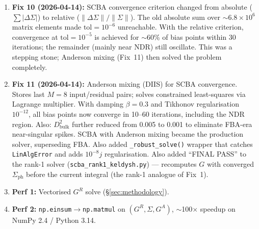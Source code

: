 \documentclass[11pt,a4paper,onecolumn]{article}
\newcommand{\code}[1]{\texttt{\small #1}}
\begin{document}
\begin{enumerate}[leftmargin=1.3em,itemsep=0pt]
$0.005 \times 35 \approx 0.1 \times 3$ (matching the molecular vibron's
effective coupling weight). Conservation improved to $<1$\%.
\item \textbf{Fix 10 (2026-04-14):} SCBA convergence criterion changed from
absolute ($\sum|\Delta\Sigma|$) to relative ($\|\Delta\Sigma\|/\|\Sigma\|$).
The old absolute sum over $\sim 6.8 \times 10^6$ matrix elements made
$\mathrm{tol} = 10^{-6}$ unreachable. With the relative criterion,
convergence at $\mathrm{tol} = 10^{-5}$ is achieved for $\sim$60\% of bias
points within 30 iterations; the remainder (mainly near NDR) still oscillate.
This was a stepping stone; Anderson mixing (Fix~11) then solved the problem
completely.
\item \textbf{Fix 11 (2026-04-14):} Anderson mixing (DIIS) for SCBA convergence.
Stores last $M = 8$ input/residual pairs; solves constrained least-squares via
Lagrange multiplier. With damping $\beta = 0.3$ and Tikhonov regularisation
$10^{-12}$, all bias points now converge in 10--60 iterations, including the
NDR region. Also: $D^2_{\mathrm{bulk}}$ further reduced from 0.005 to 0.001
to eliminate FBA-era near-singular spikes. SCBA with Anderson mixing became
the production solver, superseding FBA. Also added \code{\_robust\_solve()}
wrapper that catches \code{LinAlgError} and adds $10^{-8}j$ regularisation.
Also added ``FINAL PASS'' to the rank-1 solver (\code{scba\_rank1\_keldysh.py})
--- recomputes $G$ with converged $\Sigma_{\mathrm{ph}}$ before the current
integral (the rank-1 analogue of Fix~1).
\item \textbf{Perf 1:} Vectorised $G^R$ solve (\S\ref{sec:methodology}).
\item \textbf{Perf 2:} \code{np.einsum}$\to$\code{np.matmul} on
$(G^R,\Sigma,G^A)$, $\sim$100$\times$ speedup on NumPy 2.4 / Python 3.14.
\end{enumerate}
\end{document}
